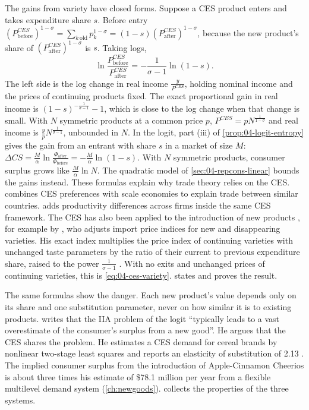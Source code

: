The gains from variety have closed forms. Suppose a CES product enters and takes expenditure share $s$. Before entry
$(P^{CES}_{\mathrm{before}})^{1-\sigma} = \sum_{k\,\mathrm{old}}p_k^{1-\sigma} = (1 - s)(P^{CES}_{\mathrm{after}})^{1-\sigma}$,
because the new product's share of $(P^{CES}_{\mathrm{after}})^{1-\sigma}$ is $s$. Taking logs,
\begin{equation}\label{eq:04-ces-variety}
\ln\frac{P^{CES}_{\mathrm{before}}}{P^{CES}_{\mathrm{after}}} = -\frac{1}{\sigma - 1}\ln(1 - s) .
\end{equation}
The left side is the log change in real income $\frac{y}{P^{CES}}$, holding nominal income and the prices of
continuing products fixed. The exact proportional gain in real income is $(1 - s)^{-\frac{1}{\sigma - 1}} - 1$,
which is close to the log change when that change is small. With $N$ symmetric products at a common price $p$,
$P^{CES} = pN^{\frac{1}{1-\sigma}}$ and real income is $\frac{y}{p}N^{\frac{1}{\sigma-1}}$, unbounded in $N$. In the
logit, part (iii) of \cref{prop:04-logit-entropy} gives the gain from an entrant with share $s$ in a market of size
$M$: $\Delta CS = \frac{M}{\alpha}\ln\frac{\Phi_{\mathrm{after}}}{\Phi_{\mathrm{before}}} = -\frac{M}{\alpha}\ln(1 - s)$. With
$N$ symmetric products, consumer surplus grows like $\frac{M}{\alpha}\ln N$. The quadratic model of
\cref{sec:04-repcons-linear} bounds the gains instead. These formulas explain why trade theory relies on the CES.
\citet{Krugman1980} combines CES preferences with scale economies to explain trade between similar countries.
\citet{Melitz2003} adds productivity differences across firms inside the same CES framework.
The CES has also been applied to the introduction of new products \citep[p.~230, n.~30]{Hausman1997}, for example by
\citet{Feenstra1994}, who adjusts import price indices for new and disappearing varieties. His exact index multiplies
the price index of continuing varieties with unchanged taste parameters by the ratio of their current to previous
expenditure share, raised to the power $\frac{1}{\sigma - 1}$ \citep[Proposition~1, p.~159]{Feenstra1994}. With no exits and unchanged prices of
continuing varieties, this is \eqref{eq:04-ces-variety}.  states and proves the result.

The same formulas show the danger. Each new product's value depends only on its share and one substitution
parameter, never on how similar it is to existing products.  writes that the IIA problem
of the logit ``typically leads to a vast overestimate of the consumer's surplus from a new good''. He argues that
the CES shares the problem. He estimates a CES demand for cereal brands by nonlinear two-stage least squares and
reports an elasticity of substitution of 2.13 \citep[p.~231]{Hausman1997}.
The implied consumer surplus from the introduction of Apple-Cinnamon Cheerios is about three times his estimate of
\$78.1 million per year from a flexible multilevel demand system (\cref{ch:newgoods}). 
collects the properties of the three systems.

